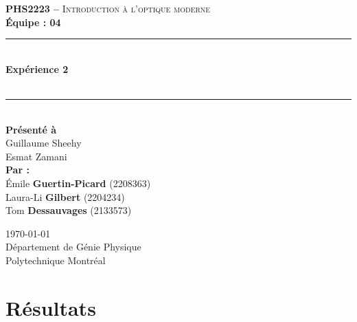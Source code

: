 \documentclass[11pt,letterpaper]{article}
\begin{document}
\begin{titlepage}
\center

\begin{figure}
\end{figure}
\vspace*{2 cm}

\textsc{\Large \textbf{PHS2223 --} Introduction à l'optique moderne}\\[0.5cm]
\large{\textbf{Équipe : 04}}\\[1.5cm]

\rule{\linewidth}{0.5mm} \\[0.5cm]
\Large{\textbf{Expérience 2}} \\[0.2cm]
\\
\rule{\linewidth}{0.2mm} \\[2.3cm]

\large{\textbf{Présenté à}\\
  Guillaume Sheehy\\
  Esmat Zamani\\[2.5cm]
  \textbf{Par :}\\
  Émile \textbf{Guertin-Picard} (2208363)\\
  Laura-Li \textbf{Gilbert} (2204234)\\
  Tom \textbf{Dessauvages} (2133573)\\[3cm]}

\large{\today\\
Département de Génie Physique\\
Polytechnique Montréal\\}

\end{titlepage}


\tableofcontents
{}
\newpage

\pagestyle{fancy}
\setlength{\headheight}{14pt}
\renewcommand{\headrulewidth}{0pt}
\fancyfoot[R]{\thepage}

\pagestyle{fancy}
\fancyhf{}
\renewcommand{\headrulewidth}{1pt}
\fancyhead[R]{\today}
\fancyfoot[R]{\thepage}

\setcounter{page}{1}


\section{Résultats}
\end{document}

